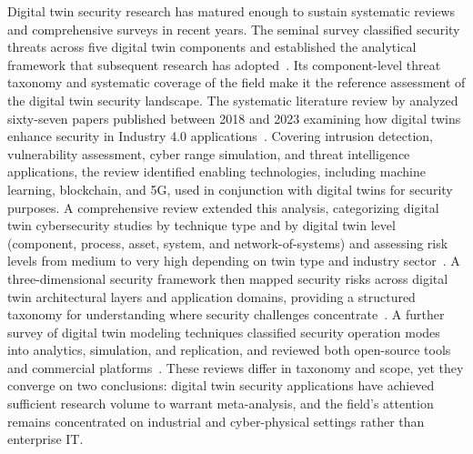 Digital twin security research has matured enough to sustain systematic reviews and comprehensive surveys in recent years. The seminal survey classified security threats across five digital twin components and established the analytical framework that subsequent research has adopted~\parencite{Alcaraz_Lopez_2022}. Its component-level threat taxonomy and systematic coverage of the field make it the reference assessment of the digital twin security landscape. The systematic literature review by \citeauthor{ElHajj_2024} analyzed sixty-seven papers published between 2018 and 2023 examining how digital twins enhance security in Industry 4.0 applications~\parencite{ElHajj_2024}. Covering intrusion detection, vulnerability assessment, cyber range simulation, and threat intelligence applications, the review identified enabling technologies, including machine learning, blockchain, and 5G, used in conjunction with digital twins for security purposes. A comprehensive review extended this analysis, categorizing digital twin cybersecurity studies by technique type and by digital twin level (component, process, asset, system, and network-of-systems) and assessing risk levels from medium to very high depending on twin type and industry sector~\parencite{Alhumam_2025}. A three-dimensional security framework then mapped security risks across digital twin architectural layers and application domains, providing a structured taxonomy for understanding where security challenges concentrate~\parencite{Jeremiah_2024}. A further survey of digital twin modeling techniques classified security operation modes into analytics, simulation, and replication, and reviewed both open-source tools and commercial platforms~\parencite{Qureshi_2025}. These reviews differ in taxonomy and scope, yet they converge on two conclusions: digital twin security applications have achieved sufficient research volume to warrant meta-analysis, and the field's attention remains concentrated on industrial and cyber-physical settings rather than enterprise IT.

